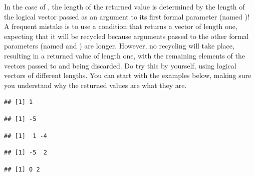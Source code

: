 \documentclass[krantz2]{krantz}\usepackage{knitr}
\begin{document}
\begin{warningbox}
In the case of , the length of the returned value is determined by the length of the logical vector passed as an argument to its first formal parameter (named )! A frequent mistake is to use a condition that returns a  vector of length one, expecting that it will be recycled because arguments passed to the other formal parameters (named  and ) are longer. However, no recycling will take place, resulting in a returned value of length one, with the remaining elements of the vectors passed to  and  being discarded. Do try this by yourself, using logical vectors of different lengths. You can start with the examples below, making sure you understand why the returned values are what they are.

\begin{knitrout}\footnotesize
{}\color{fgcolor}\begin{kframe}
\begin{alltt}
\hlstd{(}\hlstd{,} \hlopt{:}\hlstd{,} \hlopt{-}\hlopt{:-}\hlstd{)}
\end{alltt}
\begin{verbatim}
## [1] 1
\end{verbatim}
\begin{alltt}
\hlstd{(}\hlstd{,} \hlopt{:}\hlstd{,} \hlopt{-}\hlopt{:-}\hlstd{)}
\end{alltt}
\begin{verbatim}
## [1] -5
\end{verbatim}
\begin{alltt}
\hlstd{(}\hlstd{(}\hlstd{,} \hlstd{),} \hlopt{:}\hlstd{,} \hlopt{-}\hlopt{:-}\hlstd{)}
\end{alltt}
\begin{verbatim}
## [1]  1 -4
\end{verbatim}
\begin{alltt}
\hlstd{(}\hlstd{(}\hlstd{,} \hlstd{),} \hlopt{:}\hlstd{,} \hlopt{-}\hlopt{:-}\hlstd{)}
\end{alltt}
\begin{verbatim}
## [1] -5  2
\end{verbatim}
\begin{alltt}
\hlstd{(}\hlstd{(}\hlstd{,} \hlstd{),} \hlopt{:}\hlstd{,} \hlstd{)}
\end{alltt}
\begin{verbatim}
## [1] 0 2
\end{verbatim}
\end{kframe}
\end{knitrout}
\end{warningbox}
\end{document}
